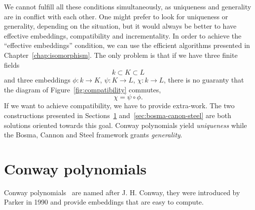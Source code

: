 We cannot fulfill all these conditions simultaneously, as
uniqueness and generality are in conflict with each other. One might prefer to
look for uniqueness or generality, depending on the situation, but it would
always be better to have effective embeddings, compatibility and incrementality.
In order to achieve the ``effective embeddings'' condition, we can use the
efficient algorithms presented in Chapter~\ref{chap:isomorphism}. The only
problem is that if we have three finite fields
\[
  k\subset K\subset L
\]
and three embeddings $\phi:k\to K$, $\psi:K\to L$, $\chi:k\to L$, there is no
guaranty that the diagram of Figure~\ref{fig:compatibility} commutes, \ie
\[
  \chi = \psi\circ\phi.
\]
If we want to achieve compatibility, we have to provide extra-work.
The two constructions presented in Sections~\ref{sec:conway}
and~\ref{sec:bosma-canon-steel} are both solutions oriented towards this goal.
Conway polynomials yield \emph{uniqueness} while the Bosma, Cannon and Steel
framework grants \emph{generality}.

\section{Conway polynomials}
\label{sec:conway}

%

Conway polynomials~\cite{Parker90, Scheerhorn92} are named after J. H. Conway,
they were introduced by Parker in 1990 and provide embeddings that are easy to
compute.

